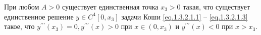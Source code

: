 \begin{lemma}\label{AbEI:lemm1} При любом $A>0$  существует единственная
точка $x_3>0$ такая, что существует единственное решение $ y \in C^4[0,x_3] $ задачи Коши
\eqref{eq.1.3.2.1.1} -- \eqref{eq.1.3.2.1.3} такое, что $y^{\prime\prime\prime}(x_3)=0,
y^{\prime\prime\prime}(x)>0 $ при $ x \in (0,x_3) $  и
$ y^{\prime\prime\prime}(x)<0 $ при $ x>x_3 $.
\end{lemma}

%
%
%
%
%

